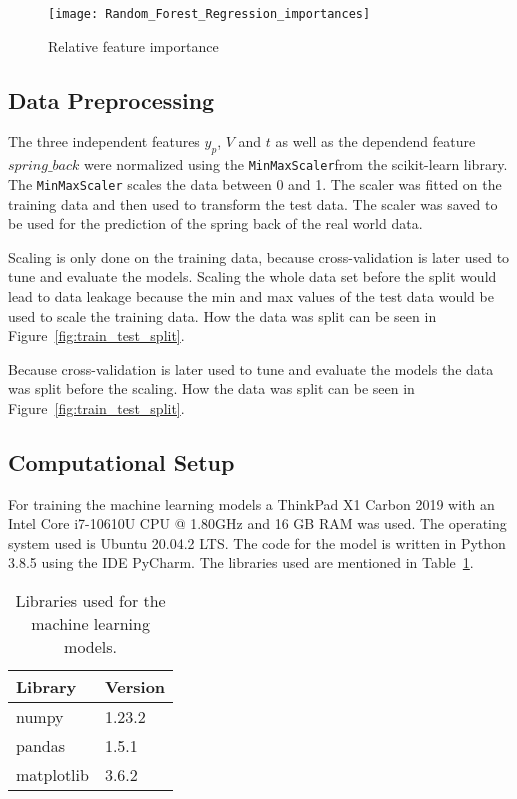 \begin{figure}[H]
    \centering
    \texttt{[image: Random\_Forest\_Regression\_importances]}
    \caption{Relative feature importance}
    \label{fig:rf_feature_importance}
\end{figure}



\subsection{Data Preprocessing}

The three independent features $y_p$, $V$ and $t$ as well as the dependend feature $spring\_back$ were normalized using the \texttt{MinMaxScaler}from the scikit-learn library. The \texttt{MinMaxScaler} scales the data between 0 and 1. The scaler was fitted on the training data and then used to transform the test data. The scaler was saved to be used for the prediction of the spring back of the real world data.

Scaling is only done on the training data, because cross-validation is later used to tune and evaluate the models. Scaling the whole data set before the split would lead to data leakage because the min and max values of the test data would be used to scale the training data.
How the data was split can be seen in Figure~\ref{fig:train_test_split}.

Because cross-validation is later used to tune and evaluate the models the data was split before the scaling. How the data was split can be seen in Figure~\ref{fig:train_test_split}.



\subsection{Computational Setup}
For training the machine learning models a ThinkPad X1 Carbon 2019 with an Intel Core i7-10610U CPU @ 1.80GHz and 16 GB RAM was used. The operating system used is Ubuntu 20.04.2 LTS. The code for the model is written in Python 3.8.5 using the IDE PyCharm. The libraries used are mentioned in Table~\ref{table:libraries}.

\captionsetup{width=1\textwidth}

\begin{table}[H]
    \centering
    \begin{tabular}{|ll|}
        \hline
        \textbf{Library} & \textbf{Version} \\
        \hline
        numpy            & 1.23.2           \\
        pandas           & 1.5.1            \\
        matplotlib       & 3.6.2            \\ \hline
    \end{tabular}
    \caption{Libraries used for the machine learning models.}
    \label{table:libraries}
\end{table}

